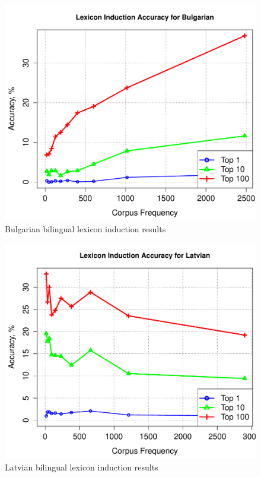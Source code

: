 \documentclass[11pt]{article}
\begin{document}
\begin{figure}
\begin{center}
\includegraphics[width=0.9 \linewidth]{../byFreqGraphs/bg/lexinductnew.pdf}
\vskip -0.15in
\caption{Bulgarian bilingual lexicon induction results}
\label{fig:bli.bg} 
\end{center}
\end{figure}

\clearpage


\begin{figure}
\begin{center}
\includegraphics[width=0.9 \linewidth]{../byFreqGraphs/lv/lexinductnew.pdf}
\vskip -0.15in
\caption{Latvian bilingual lexicon induction results}
\label{fig:bli.lv} 
\end{center}
\end{figure}
\end{document}
